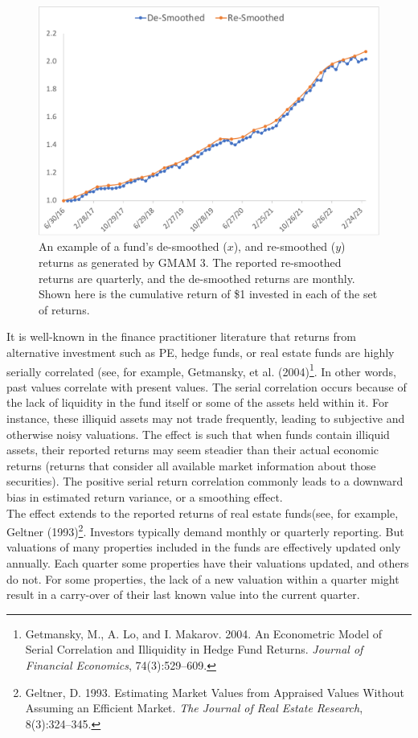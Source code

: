 \documentclass{ledger}
\begin{document}
\begin{figure}[!h]
	\centering
	\includegraphics[width=400pt]{desmoothed.pdf}
	\parbox{425pt}{\caption{An example of a fund’s de-smoothed ($x$), and re-smoothed ($y$) returns as generated by GMAM 3. The reported re-smoothed returns are quarterly, and the de-smoothed returns are monthly. Shown here is the cumulative return of \$1 invested in each of the set of returns. }}
\end{figure}

It is well-known in the finance practitioner literature that returns from alternative investment such as PE, hedge funds, or real estate funds are highly serially correlated (see, for example, Getmansky, et al. (2004)\footnote{Getmansky, M., A. Lo, and I. Makarov. 2004. An Econometric Model of Serial Correlation and Illiquidity in Hedge Fund Returns. \textit{Journal of Financial Economics}, 74(3):529–609.}. In other words, past values correlate with present values. The serial correlation occurs because of the lack of liquidity in the fund itself or some of the assets held within it. For instance, these illiquid assets may not trade frequently, leading to subjective and otherwise noisy valuations.  The effect is such that when funds contain illiquid assets, their reported returns may seem steadier than their actual economic returns (returns that consider all available market information about those securities). The positive serial return correlation commonly leads to a downward bias in estimated return variance, or a  smoothing effect. \\

The effect extends to the reported returns of real estate funds(see, for example, Geltner (1993)\footnote{Geltner, D. 1993. Estimating Market Values from Appraised Values Without Assuming an Efficient Market. \textit{The Journal of Real Estate Research}, 8(3):324–345.}. Investors typically demand monthly or quarterly reporting. But valuations of many properties included in the funds are effectively updated only annually. Each quarter some properties have their valuations updated, and others do not. For some properties, the lack of a new valuation within a quarter might result in a carry-over of their last known value into the current quarter.  \\
\end{document}

